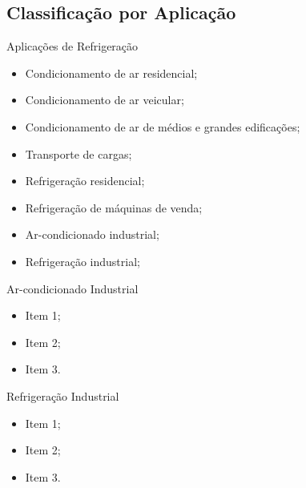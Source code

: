 \subsection{Classificação por Aplicação}

    \begin{frame}{Aplicações de Refrigeração}\vspace*{-0em}
        \begin{itemize}
            \item<1-> Condicionamento de ar residencial;
            \item<2-> Condicionamento de ar veicular;
            \item<3-> Condicionamento de ar de médios e grandes edificações;
            \item<4-> Transporte de cargas;
            \item<5-> Refrigeração residencial;
            \item<6-> Refrigeração de máquinas de venda;
            \item<7-> Ar-condicionado industrial;
            \item<8-> Refrigeração industrial;
        \end{itemize}
    \end{frame}

    \begin{frame}{Ar-condicionado Industrial}\vspace*{-0em}
        \begin{itemize}
            \item<1-> Item 1;
            \item<2-> Item 2;
            \item<3-> Item 3.
        \end{itemize}
    \end{frame}

    \begin{frame}{Refrigeração Industrial}\vspace*{-0em}
        \begin{itemize}
            \item<1-> Item 1;
            \item<2-> Item 2;
            \item<3-> Item 3.
        \end{itemize}
    \end{frame}


